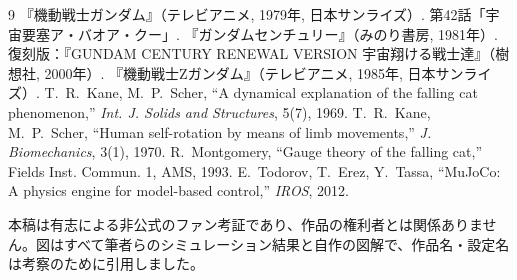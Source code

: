 \documentclass[paper=a4paper,fontsize=10pt,twocolumn,column_gap=2zw,line_length=24zw,number_of_lines=46,head_space=18mm]{jlreq}
\begin{document}
\vspace{2mm}
\begin{thebibliography}{9}\footnotesize\setlength{\itemsep}{0pt}
 『機動戦士ガンダム』（テレビアニメ, 1979年, 日本サンライズ）. 第42話「宇宙要塞ア・バオア・クー」.
 『ガンダムセンチュリー』（みのり書房, 1981年）. 復刻版：『GUNDAM CENTURY RENEWAL VERSION 宇宙翔ける戦士達』（樹想社, 2000年）.
 『機動戦士Ζガンダム』（テレビアニメ, 1985年, 日本サンライズ）.
 T.~R.~Kane, M.~P.~Scher, ``A dynamical explanation of the falling cat phenomenon,'' \textit{Int. J. Solids and Structures}, 5(7), 1969.
 T.~R.~Kane, M.~P.~Scher, ``Human self-rotation by means of limb movements,'' \textit{J. Biomechanics}, 3(1), 1970.
 R.~Montgomery, ``Gauge theory of the falling cat,'' Fields Inst. Commun. 1, AMS, 1993.
 E.~Todorov, T.~Erez, Y.~Tassa, ``MuJoCo: A physics engine for model-based control,'' \textit{IROS}, 2012.
\end{thebibliography}
{\scriptsize 本稿は有志による非公式のファン考証であり、作品の権利者とは関係ありません。図はすべて筆者らのシミュレーション結果と自作の図解で、作品名・設定名は考察のために引用しました。}
\end{document}
